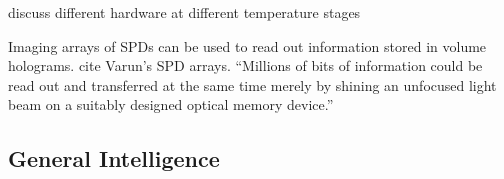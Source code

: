 \vspace{3em}
discuss different hardware at different temperature stages

\vspace{3em}
Imaging arrays of SPDs can be used to read out information stored in volume holograms. cite Varun's SPD arrays. ``Millions of bits of information could be read out and transferred at the same time merely by shining an unfocused light beam on a suitably designed optical memory device.'' \cite{abps1987}

\subsection{General Intelligence}
